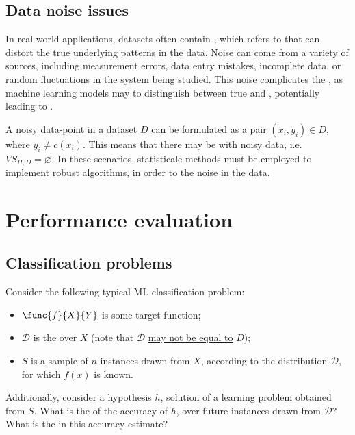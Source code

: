 \documentclass[a4paper, 12pt]{report}
\begin{document}
    \subsection{Data noise issues}

    In real-world applications, datasets often contain , which refers to  that can distort the true underlying patterns in the data. Noise can come from a variety of sources, including measurement errors, data entry mistakes, incomplete data, or random fluctuations in the system being studied. This noise complicates the , as machine learning models may  to distinguish between true  and , potentially leading to .

    A noisy data-point in a dataset $D$ can be formulated as a pair $(x_i, y_i) \in D$, where $y_i \neq c(x_i)$. This means that there may be  with noisy data, i.e. $VS_{H, D} = \varnothing$. In these scenarios, statisticale methods must be employed to implement robust algorithms, in order to  the noise in the data.

    \section{Performance evaluation}

    \subsection{Classification problems}

    Consider the following typical ML classification problem:

    \begin{itemize}
        \item $\func{f}{X}{Y}$ is some target function;
        \item $\mathcal D$ is the  over $X$ (note that $\mathcal D$ \underline{may not be equal to} $D$);
        \item $S$ is a sample of $n$ instances drawn from $X$, according to the distribution $\mathcal D$, for which $f(x)$ is known.
    \end{itemize}

    Additionally, consider a hypothesis $h$, solution of a learning problem obtained from $S$. What is the  of the accuracy of $h$, over future instances drawn from $\mathcal D$? What is the  in this accuracy estimate?
\end{document}
